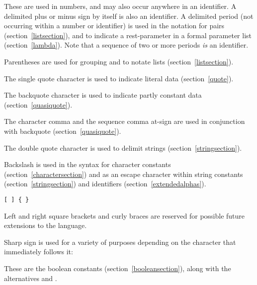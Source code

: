 \begin{description}{}{}

\item[{\tt.\ + -}]
These are used in numbers, and may also occur anywhere in an identifier.
A delimited plus or minus sign by itself
is also an identifier.
A delimited period (not occurring within a number or identifier) is used
in the notation for pairs (section~\ref{listsection}), and to indicate a
rest-parameter in a  formal parameter list (section~\ref{lambda}).
Note that a sequence of two or more periods {\em is} an identifier.

\item[\tt( )]
Parentheses are used for grouping and to notate lists
(section~\ref{listsection}).

\item[\singlequote]
The single quote character is used to indicate literal data (section~\ref{quote}).

\item[\backquote]
The backquote character is used to indicate partly constant
data (section~\ref{quasiquote}).

\item[\tt, ,@]
The character comma and the sequence comma at-sign are used in conjunction
with backquote (section~\ref{quasiquote}).

\item[\tt"]
The double quote character is used to delimit strings (section~\ref{stringsection}).

\item[\backwhack]
Backslash is used in the syntax for character constants
(section~\ref{charactersection}) and as an escape character within string
constants (section~\ref{stringsection}) and identifiers
(section~\ref{extendedalphas}).

\hbox{\tt \verb"[" \verb"]" \verb"{" \verb"}"}
\item[\copy0]
Left and right square brackets and curly braces
are reserved for possible future extensions to the language.

\item[\sharpsign] Sharp sign is used for a variety of purposes depending on
the character that immediately follows it:

\item[\schtrue{} \schfalse{}]
These are the boolean constants (section~\ref{booleansection}),
along with the alternatives  and .


\end{description}
